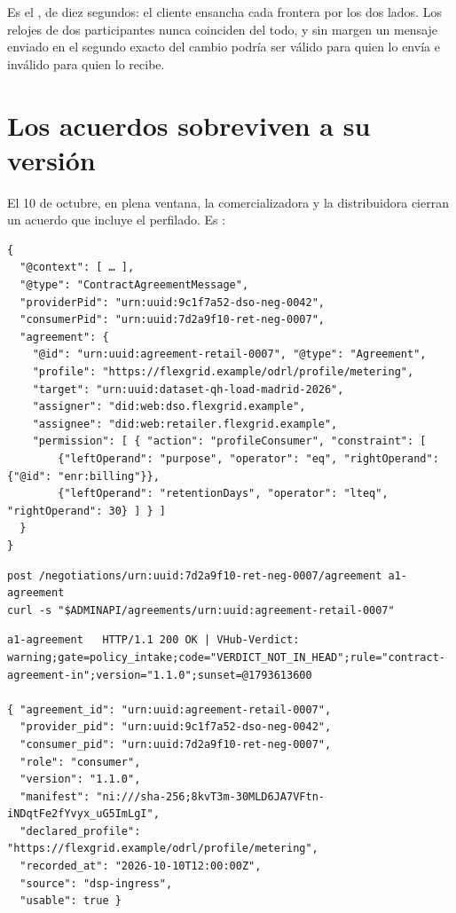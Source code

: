 Es el , de diez segundos: el cliente ensancha cada frontera por los dos lados. Los relojes de
dos participantes nunca coinciden del todo, y sin margen un mensaje enviado en el segundo exacto del cambio
podría ser válido para quien lo envía e inválido para quien lo recibe.

\section{Los acuerdos sobreviven a su versión}

El 10 de octubre, en plena ventana, la comercializadora y la distribuidora cierran un acuerdo que incluye el
perfilado. Es :

\begin{lstlisting}[style=json]
{
  "@context": [ … ],
  "@type": "ContractAgreementMessage",
  "providerPid": "urn:uuid:9c1f7a52-dso-neg-0042",
  "consumerPid": "urn:uuid:7d2a9f10-ret-neg-0007",
  "agreement": {
    "@id": "urn:uuid:agreement-retail-0007", "@type": "Agreement",
    "profile": "https://flexgrid.example/odrl/profile/metering",
    "target": "urn:uuid:dataset-qh-load-madrid-2026",
    "assigner": "did:web:dso.flexgrid.example",
    "assignee": "did:web:retailer.flexgrid.example",
    "permission": [ { "action": "profileConsumer", "constraint": [
        {"leftOperand": "purpose", "operator": "eq", "rightOperand": {"@id": "enr:billing"}},
        {"leftOperand": "retentionDays", "operator": "lteq", "rightOperand": 30} ] } ]
  }
}
\end{lstlisting}

\begin{lstlisting}[style=sh]
post /negotiations/urn:uuid:7d2a9f10-ret-neg-0007/agreement a1-agreement
curl -s "$ADMINAPI/agreements/urn:uuid:agreement-retail-0007"
\end{lstlisting}
\begin{lstlisting}[style=out]
a1-agreement   HTTP/1.1 200 OK | VHub-Verdict: warning;gate=policy_intake;code="VERDICT_NOT_IN_HEAD";rule="contract-agreement-in";version="1.1.0";sunset=@1793613600

{ "agreement_id": "urn:uuid:agreement-retail-0007",
  "provider_pid": "urn:uuid:9c1f7a52-dso-neg-0042",
  "consumer_pid": "urn:uuid:7d2a9f10-ret-neg-0007",
  "role": "consumer",
  "version": "1.1.0",
  "manifest": "ni:///sha-256;8kvT3m-30MLD6JA7VFtn-iNDqtFe2fYvyx_uG5ImLgI",
  "declared_profile": "https://flexgrid.example/odrl/profile/metering",
  "recorded_at": "2026-10-10T12:00:00Z",
  "source": "dsp-ingress",
  "usable": true }
\end{lstlisting}

